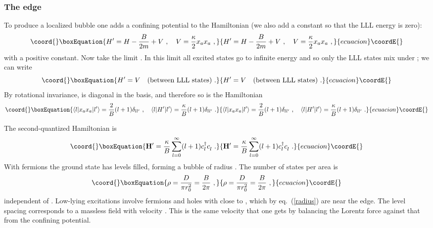 \documentclass[a4paper,12pt]{article}
\begin{document}
\subsubsection{The edge}

To produce a localized bubble one adds a confining potential to the
Hamiltonian (we also add a constant so that the LLL energy is zero):
\begin{equation}\coord{}\boxEquation{
H' = H - \frac{B}{2m} + V\ , \quad V = \frac{\kappa}{2} x_a x_a\ ,
\label{conf}
}{
H' = H - \frac{B}{2m} + V\ , \quad V = \frac{\kappa}{2} x_a x_a\ ,
}{ecuacion}\coordE{}\end{equation}
with \myHighlight{$\kappa$}\coordHE{} a positive constant.
Now take the limit \coordHE{}.  In this limit all excited states go to
infinite energy and so only the LLL states mix under \coordHE{}; we can write
\begin{equation}\coord{}\boxEquation{
H' = V \quad (\mbox{between LLL states})\ .
}{
H' = V \quad (\mbox{between LLL states})\ .
}{ecuacion}\coordE{}\end{equation}
By
rotational invariance, \coordHE{} is diagonal in the \coordHE{} basis, and
therefore so is the Hamiltonian
\begin{equation}\coord{}\boxEquation{
\langle l | x_a x_a | l' \rangle = \frac{2}{B} (l+1) \delta_{ll'} \
,\quad
\langle l | H' | l' \rangle = \frac{\kappa}{B} (l+1) \delta_{ll'} \ .
\label{radius}
}{
\langle l | x_a x_a | l' \rangle = \frac{2}{B} (l+1) \delta_{ll'} \
,\quad
\langle l | H' | l' \rangle = \frac{\kappa}{B} (l+1) \delta_{ll'} \ .
}{ecuacion}\coordE{}\end{equation}

The second-quantized Hamiltonian is 
\begin{equation}\coord{}\boxEquation{
{\bf H}' = \frac{\kappa}{B} \sum_{l = 0}^\infty (l+1)
{c^\dagger_l} c^{\vphantom{\dagger}}_l \ .
}{
{\bf H}' = \frac{\kappa}{B} \sum_{l = 0}^\infty (l+1)
{c^\dagger_l} c^{\vphantom{\dagger}}_l \ .
}{ecuacion}\coordE{}\end{equation}
With \myHighlight{$D$}\coordHE{} fermions the ground state has levels \myHighlight{$l = 0,1,
\ldots,D-1$}\coordHE{} filled, forming a bubble of radius \coordHE{}.
The number of states per area is
\begin{equation}\coord{}\boxEquation{
\rho = \frac{D}{\pi r_0^2} = \frac{B}{2\pi}\ ,
}{
\rho = \frac{D}{\pi r_0^2} = \frac{B}{2\pi}\ ,
}{ecuacion}\coordE{}\end{equation}
independent of \myHighlight{$D$}\coordHE{}.
Low-lying excitations involve fermions and holes with \coordHE{} close to \coordHE{},
which by eq.~(\ref{radius}) are near the edge.  
The level spacing \myHighlight{$\kappa/B$}\coordHE{} corresponds to a massless field with velocity \myHighlight{$v
= r_0 \kappa/B$}\coordHE{}.  This is the same velocity that one gets by balancing the
Lorentz force against that from the confining potential.
\end{document}
